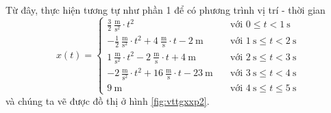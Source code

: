 \documentclass[a4paper, titlepage, openany]{book}
\numberwithin{equation}{chapter}
\begin{document}
Từ đây, thực hiện tương tự như phần 1 để có phương trình vị trí - thời gian
\begin{equation*}
   x(t) = \begin{cases}
      \frac{3}{2}\ \frac{\text{m}}{\text{s}^2}\cdot t^2 &\quad \text{với } 0 \leq t < 1\ \text{s}\\
      -\frac{1}{2}\ \frac{\text{m}}{\text{s}^2}\cdot t^2 + 4\ \frac{\text{m}}{\text{s}}\cdot t - 2\ \text{m}&\quad \text{với } 1\ \text{s} \leq t < 2\ \text{s}\\
      1\ \frac{\text{m}}{\text{s}^2}\cdot t^2 - 2\ \frac{\text{m}}{\text{s}}\cdot t + 4\ \text{m}&\quad \text{với } 2\ \text{s} \leq t < 3\ \text{s}\\
      -2\ \frac{\text{m}}{\text{s}^2}\cdot t^2+16\ \frac{\text{m}}{\text{s}}\cdot t-23\ \text{m}&\quad \text{với } 3\ \text{s} \leq t < 4\ \text{s}\\
      9\ \text{m}&\quad \text{với } 4\ \text{s} \leq t \leq 5\ \text{s}
   \end{cases}
\end{equation*}
và chúng ta vẽ được đồ thị ở hình \ref{fig:vttgxxp2}.
\end{document}
